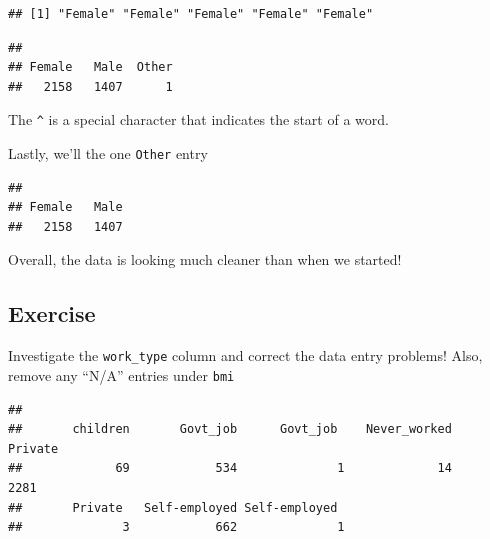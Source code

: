 \documentclass[
]{book}
\newenvironment{Shaded}{\begin{snugshade}}{\end{snugshade}}
\newcommand{\CommentTok}[1]{\textcolor[rgb]{0.56,0.35,0.01}{\textit{#1}}}
\newcommand{\FunctionTok}[1]{\textcolor[rgb]{0.13,0.29,0.53}{\textbf{#1}}}
\newcommand{\NormalTok}[1]{#1}
\newcommand{\OtherTok}[1]{\textcolor[rgb]{0.56,0.35,0.01}{#1}}
\newcommand{\SpecialCharTok}[1]{\textcolor[rgb]{0.81,0.36,0.00}{\textbf{#1}}}
\newcommand{\StringTok}[1]{\textcolor[rgb]{0.31,0.60,0.02}{#1}}
\begin{document}
\begin{verbatim}
## [1] "Female" "Female" "Female" "Female" "Female"
\end{verbatim}

\begin{Shaded}
\end{Shaded}

\begin{verbatim}
## 
## Female   Male  Other 
##   2158   1407      1
\end{verbatim}

The \texttt{\^{}} is a special character that indicates the start of a word.

Lastly, we'll the one \texttt{Other} entry

\begin{Shaded}
\end{Shaded}

\begin{verbatim}
## 
## Female   Male 
##   2158   1407
\end{verbatim}

Overall, the data is looking much cleaner than when we started!

\subsection{Exercise}\label{exercise-6}

Investigate the \texttt{work\_type} column and correct the data entry problems! Also, remove any ``N/A'' entries under \texttt{bmi}

\begin{Shaded}
\end{Shaded}

\begin{verbatim}
## 
##       children       Govt_job      Govt_job    Never_worked        Private 
##             69            534              1             14           2281 
##       Private   Self-employed Self-employed  
##              3            662              1
\end{verbatim}
\end{document}
